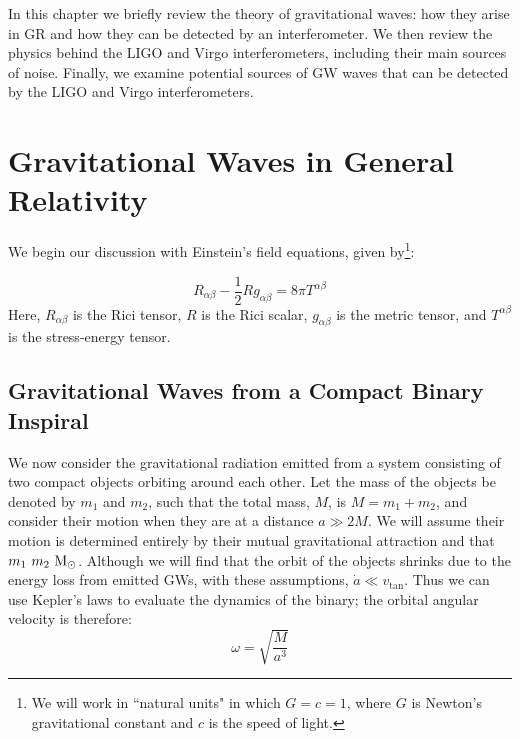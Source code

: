 \def\qI{\ensuremath{\mathcal{I}}}
\def\TT{\ensuremath{\mathrm{TT}}}
\def\fGW{\ensuremath{f_{\mathrm{GW}}}}

In this chapter we briefly review the theory of gravitational waves: how they arise in \ac{GR} and how they can be detected by an interferometer. We then review the physics behind the \ac{LIGO} and Virgo interferometers, including their main sources of noise. Finally, we examine potential sources of \ac{GW} waves that can be detected by the \ac{LIGO} and Virgo interferometers.

\section{Gravitational Waves in General Relativity}

We begin our discussion with Einstein's field equations, given by\footnote{We will work in ``natural units" in which $G = c = 1$, where $G$ is Newton's gravitational constant and $c$ is the speed of light.}:

\begin{equation}
\label{eqn:einstein_field_eqns}
R_{\alpha \beta} - \frac{1}{2}R g_{\alpha\beta} = 8\pi T^{\alpha \beta}
\end{equation}
Here, $R_{\alpha \beta}$ is the Rici tensor, $R$ is the Rici scalar, $g_{\alpha \beta}$ is the metric tensor, and $T^{\alpha \beta}$ is the stress-energy tensor.


\subsection{Gravitational Waves from a Compact Binary Inspiral}

We now consider the gravitational radiation emitted from a system consisting of two compact objects orbiting around each other. Let the mass of the objects be denoted by $m_1$ and $m_2$, such that the total mass, $M$, is $M = m_1 + m_2$, and consider their motion when they are at a distance $a \gg 2M$. We will assume their motion is determined entirely by their mutual gravitational attraction and that $m_1 ~ m_2 ~ \mathrm{M_\odot}$. Although we will find that the orbit of the objects shrinks due to the energy loss from emitted \acp{GW}, with these assumptions, $\dot{a} \ll v_{\mathrm{tan}}$. Thus we can use Kepler's laws to evaluate the dynamics of the binary; the orbital angular velocity is therefore:
\begin{equation}
\label{eqn:orbit_ang_v}
\omega = \sqrt{\frac{M}{a^3}}
\end{equation}

